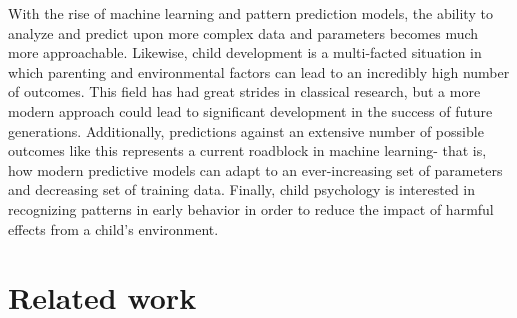 \documentclass[11pt]{extarticle}
\begin{document}
\begin{mdframed}
    With the rise of machine learning and pattern prediction models, the ability to analyze and predict upon more complex data and parameters becomes much more approachable.
    Likewise, child development is a multi-facted situation in which parenting and environmental factors can lead to an incredibly high number of outcomes.
    This field has had great strides in classical research, but a more modern approach could lead to significant development in the success of future generations.
    Additionally, predictions against an extensive number of possible outcomes like this represents a current roadblock in machine learning- that is, how modern predictive models can adapt to an ever-increasing set of parameters and decreasing set of training data.
    Finally, child psychology is interested in recognizing patterns in early behavior in order to reduce the impact of harmful effects from a child's environment.
\end{mdframed}

\section{Related work} 
\end{document}
